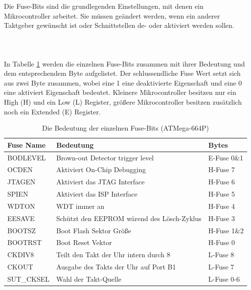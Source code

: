 Die Fuse-Bits sind die grundlegenden Einstellungen, mit denen ein
Mikrocontroller arbeitet. Sie müssen geändert werden, wenn ein anderer Taktgeber
gewünscht ist oder Schnittstellen de- oder aktiviert werden sollen.\\
\\
\\
\\
In Tabelle \ref{fuses-names} werden die einzelnen Fuse-Bits zusammen mit ihrer
Bedeutung und dem entsprechendem Byte aufgelistet. Der schlussendliche Fuse Wert
setzt sich aus zwei Byte zusammen, wobei eine 1 eine deaktivierte Eigenschaft und
eine 0 eine aktiviert Eigenschaft bedeutet. Kleinere Mikrocontroller besitzen nur ein
High (H) und ein Low (L) Register, größere Mikrocontroller besitzen zusätzlich
noch ein Extended (E) Register.

\begin{table} [H]
\begin{tabular}{|l|l|l|} \hline
Fuse Name & Bedeutung & Bytes\\ \hline
BODLEVEL & Brown-out Detector trigger level & E-Fuse 0\&1\\ \hline
OCDEN & Aktiviert On-Chip Debugging & H-Fuse 7\\ \hline
JTAGEN & Aktiviert das \ac{JTAG} Interface & H-Fuse 6\\ \hline
SPIEN & Aktiviert das \ac{ISP} Interface & H-Fuse 5\\ \hline
WDTON & \ac{WDT} immer an & H-Fuse 4\\ \hline
EESAVE & Schützt den \acs{EEPROM} wärend des Lösch-Zyklus & H-Fuse 3\\ \hline
BOOTSZ & Boot Flash Sektor Größe & H-Fuse 1\&2\\ \hline
BOOTRST & Boot Reset Vektor & H-Fuse 0\\ \hline
CKDIV8 & Teilt den Takt der Uhr intern durch 8 & L-Fuse 8\\ \hline
CKOUT & Ausgabe des Takts der Uhr auf Port B1 & L-Fuse 7\\ \hline
SUT\_CKSEL & Wahl der Takt-Quelle & L-Fuse 0-6\\ \hline
\end{tabular}
\caption{Die Bedeutung der einzelnen Fuse-Bits (ATMega-664P)}
\label{fuses-names}
\end{table}

